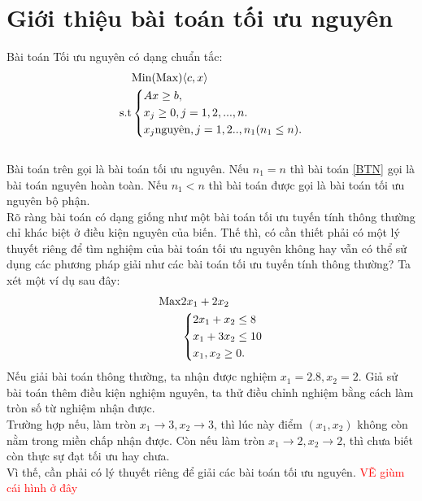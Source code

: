 \documentclass[12pt,a4paper]{report}
\begin{document}
\section{Giới thiệu bài toán tối ưu nguyên}
Bài toán Tối ưu nguyên có dạng chuẩn tắc:\\
    \begin{equation}\label{BTN}
     \begin{split}
          & {\rm{Min (Max)}} \langle c,x \rangle\\
          \rm{s.t} &\left\{\begin{split}
            & Ax\ge b,\\
            & x_j \ge 0, j=1,2,...,n.\\
            & x_j \text{nguyên}, j=1,2..,n_1 (n_1\le n).\\
           \end{split}\right.
       \end{split}
   \end{equation}
   \\
   
 Bài toán trên gọi là bài toán tối ưu nguyên. Nếu $n_1=n$ thì bài toán \eqref{BTN} gọi là bài toán nguyên hoàn toàn. Nếu $n_1 <n$ thì bài toán được gọi là bài toán tối ưu nguyên bộ phận.\\
Rõ ràng bài toán có dạng giống như một bài toán tối ưu tuyến tính thông thường chỉ khác biệt ở điều kiện nguyên của biến. Thế thì, có cần thiết phải có một lý thuyết riêng để tìm nghiệm của bài toán tối ưu nguyên không hay vẫn có thể sử dụng các phương pháp giải như các bài toán tối ưu tuyến tính thông thường? Ta xét một ví dụ sau đây:\\

\begin{equation*}
    \begin{split}
      \rm{Max}  & 2x_1+2x_2 \\
      &\left\{\begin{split}
          &2x_1+x_2 \le 8\\
          & x_1+3x_2 \le 10\\
          & x_1,x_2 \ge 0.\\
      \end{split}\right.
    \end{split}
\end{equation*}
Nếu giải bài toán thông thường, ta nhận được nghiệm $x_1=2.8,x_2=2$. Giả sử bài toán thêm điều kiện nghiệm nguyên, ta thử điều chỉnh nghiệm bằng cách làm tròn số từ nghiệm nhận được.\\
Trường hợp nếu, làm tròn $x_1 \to 3, x_2 \to 3$, thì lúc này điểm $(x_1,x_2)$ không còn nằm trong miền chấp nhận được. Còn nếu làm tròn $x_1 \to 2, x_2 \to 2$, thì chưa biết còn thực sự đạt tối ưu hay chưa.\\
Vì thế, cần phải có lý thuyết riêng để giải các bài toán tối ưu nguyên.
\textcolor{red}{VẼ giùm cái hình ở đây}
\end{document}
